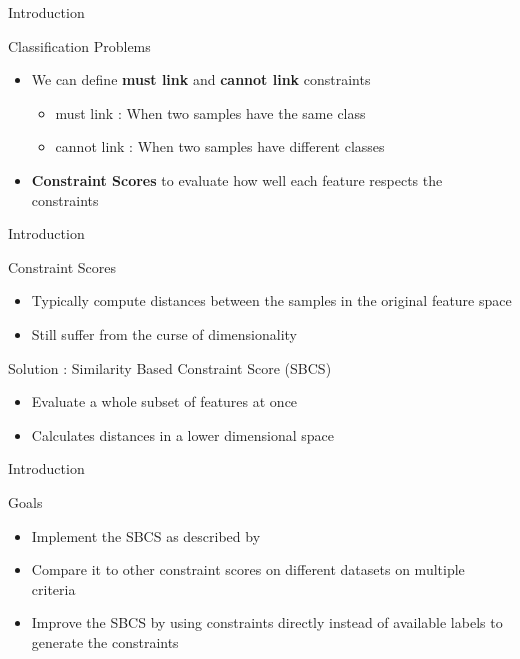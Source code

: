 \documentclass{beamer}
\begin{document}
\begin{frame}{Introduction}
    \begin{block}{Classification Problems}
        \begin{itemize}
            \item We can define \textbf{must link} and \textbf{cannot link} constraints
                \begin{itemize}
                    \item must link : When two samples have the same class
                    \item cannot link : When two samples have different classes
                \end{itemize}
            \item \textbf{Constraint Scores} to evaluate how well each feature respects the constraints
        \end{itemize}
    \end{block}
\end{frame}

\begin{frame}{Introduction}
    \begin{block}{Constraint Scores}
        \begin{itemize}
            \item Typically compute distances between the samples in the original feature space
            \item Still suffer from the curse of dimensionality
        \end{itemize}
    \end{block}
\vspace*{1cm}
    \begin{block}{Solution : Similarity Based Constraint Score (SBCS)}
        \begin{itemize}
            \item Evaluate a whole subset of features at once
            \item Calculates distances in a lower dimensional space
        \end{itemize}
    \end{block}

\end{frame}

\begin{frame}{Introduction}
    \begin{block}{Goals}
        \begin{itemize}
            \item Implement the SBCS as described by \cite{salmiSimilaritybasedConstraintScore2020}
            \item Compare it to other constraint scores on different datasets on multiple criteria
            \item Improve the SBCS by using constraints directly instead of available labels to generate the constraints
        \end{itemize}
    \end{block}
\end{frame}
\end{document}
